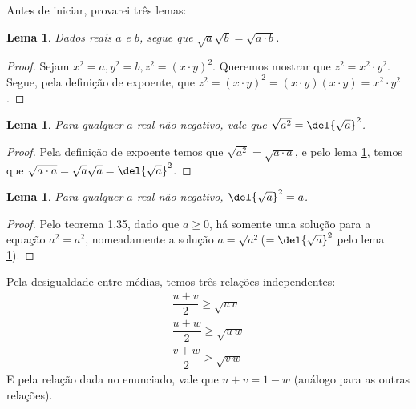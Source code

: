 \documentclass{IMTexam}
\newtheorem{lemma}[theorem]{Lema}
\begin{document}
\begin{questions}
		\begin{solution}
			Antes de iniciar, provarei três lemas:
			
			\begin{lemma}\label{lemma:lem9}
				Dados reais $ a $ e $ b $, segue que $ \sqrt{a}\sqrt{b}=\sqrt{a\cdot b} $.
			\end{lemma}
		
			\begin{proof}
				Sejam $ x^{2}=a, y^{2}=b, z^{2}=(x\cdot y)^{2} $. Queremos mostrar que $ z^{2}=x^{2}\cdot y^{2} $. Segue, pela definição de expoente, que $ z^{2}=(x\cdot y)^{2}=(x\cdot y)(x\cdot y)=x^{2}\cdot y^{2} $.
			\end{proof}
		
			\begin{lemma}
				Para qualquer $ a $ real não negativo, vale que $ \sqrt{a^{2}}=\del{\sqrt{a}}^{2} $.
			\end{lemma}
			
			\begin{proof}
				Pela definição de expoente temos que $ \sqrt{a^{2}}=\sqrt{a\cdot a} $, e pelo lema \ref{lemma:lem9}, temos que $ \sqrt{a\cdot a}=\sqrt{a}\sqrt{a}=\del{\sqrt{a}}^{2} $.
			\end{proof}
		
			\begin{lemma}\label{lemma:lem10}
				Para qualquer $ a $ real não negativo, $ \del{\sqrt{a}}^{2}=a $.
			\end{lemma}
		
			\begin{proof}
				Pelo teorema 1.35, dado que $ a\geqslant 0 $, há somente uma solução para a equação $ a^{2}=a^{2} $, nomeadamente a solução $ a=\sqrt{a^{2}} $($ =\del{\sqrt{a}}^{2} $ pelo lema \ref{lemma:lem9}).
			\end{proof}
			
			Pela desigualdade entre médias, temos três relações independentes:
			\begin{gather}
				\dfrac{u+v}{2}\geqslant \sqrt{u\,v}\\
				\dfrac{u+w}{2}\geqslant \sqrt{u\,w}\\
				\dfrac{v+w}{2}\geqslant \sqrt{v\,w}
			\end{gather}
			E pela relação dada no enunciado, vale que $ u+v = 1-w $ (análogo para as outras relações).
			

\end{solution}
\end{questions}
\end{document}
